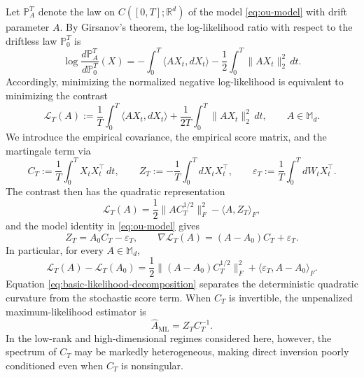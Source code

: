 \documentclass[11pt]{article}
\begin{document}

Let $\mathbb P_A^T$ denote the law on $C([0,T];\mathbb R^d)$ of the model
\eqref{eq:ou-model} with drift parameter $A$. By Girsanov's theorem, the
log-likelihood ratio with respect to the driftless law $\mathbb P_0^T$ is
\[
    \log\frac{d\mathbb P_A^T}{d\mathbb P_0^T}(X)
    =-
    \int_0^T\langle AX_t,dX_t\rangle
    -\frac12\int_0^T\|AX_t\|_2^2\,dt.
\]
Accordingly, minimizing the normalized negative log-likelihood is equivalent to
minimizing the contrast
\begin{equation}
    \mathcal L_T(A)
    :=\frac{1}{T}\int_0^T\langle AX_t,dX_t\rangle
      +\frac{1}{2T}\int_0^T\|AX_t\|_2^2\,dt,
    \qquad A\in\mathbb M_d.
\label{eq:contrast}
\end{equation}
We
introduce the empirical covariance, the empirical score matrix, and the
martingale term via
\begin{equation}
    C_T:=\frac{1}{T}\int_0^T X_tX_t^\top\,dt,
    \qquad
    Z_T:=-\frac{1}{T}\int_0^T dX_tX_t^\top,
    \qquad
    \varepsilon_T:=\frac{1}{T}\int_0^T dW_tX_t^\top.
\label{eq:empirical-objects}
\end{equation}
The contrast then has the quadratic representation
\begin{equation}
    \mathcal L_T(A)
    =\frac12\|AC_T^{1/2}\|_F^2-\langle A,Z_T\rangle_F,
\label{eq:quadratic-likelihood}
\end{equation}
and the model identity in \eqref{eq:ou-model} gives
\begin{equation}
    Z_T=A_0C_T-\varepsilon_T,
    \qquad
    \nabla\mathcal L_T(A)=(A-A_0)C_T+\varepsilon_T.
\label{eq:score-decomposition}
\end{equation}
In particular, for every $A\in\mathbb M_d$,
\begin{equation}
    \mathcal L_T(A)-\mathcal L_T(A_0)
    =\frac12\big\|(A-A_0)C_T^{1/2}\big\|_F^2
      +\langle\varepsilon_T,A-A_0\rangle_F.
\label{eq:basic-likelihood-decomposition}
\end{equation}
Equation \eqref{eq:basic-likelihood-decomposition} separates the deterministic
quadratic curvature from the stochastic score term. When $C_T$ is invertible,
the unpenalized maximum-likelihood estimator is
\[
    \widehat A_{\mathrm{ML}}=Z_TC_T^{-1}.
\]
In the low-rank and high-dimensional regimes considered here, however, the
spectrum of $C_T$ may be markedly heterogeneous, making direct inversion poorly
conditioned even when $C_T$ is nonsingular.
\end{document}

